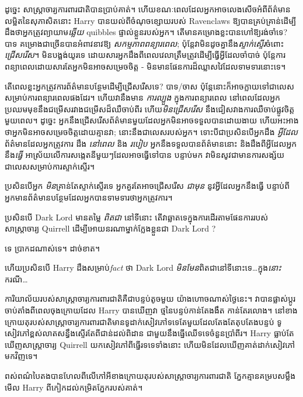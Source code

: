 
 

\hplettrineextrapara
ដូច្នេះ សាស្ត្រាចារ្យការពារជាតិបានប្រាប់គាត់។ ហើយខណៈពេលដែលអ្នកអាចលេងសើចអំពីព័ត៌មានលម្អិតនៃសុភាសិតនោះ Harry បានយល់ពីចំណុចខ្សោយរបស់ Ravenclaws ឱ្យបានគ្រប់គ្រាន់ដើម្បីដឹងថាអ្នកត្រូវព្យាយាម\emph{ឆ្លើយ} quibbles ផ្ទាល់ខ្លួនរបស់អ្នក។ តើ​មាន​គម្រោង​ខ្លះ​បាន​ហៅ​ឱ្យ​រង់ចាំ​ទេ? បាទ គម្រោងជាច្រើនបានអំពាវនាវឱ្យ \emph{សកម្មភាពពន្យារពេល}; ប៉ុន្តែវាមិនដូចគ្នានឹង\emph{ស្ទាក់ស្ទើរ}ចំពោះ\emph{ជ្រើសរើស}។ មិនបង្អង់យូរទេ ដោយសារអ្នកដឹងពីពេលវេលាត្រឹមត្រូវដើម្បីធ្វើអ្វីដែលចាំបាច់ ប៉ុន្តែការពន្យាពេលដោយសារតែអ្នកមិនអាចសម្រេចចិត្ត - មិនមានផែនការដ៏ឈ្លាសវៃដែលទាមទារនោះទេ។

តើពេលខ្លះអ្នកត្រូវការព័ត៌មានបន្ថែមដើម្បីជ្រើសរើសទេ? បាទ/ចាស ប៉ុន្តែនោះក៏អាចក្លាយទៅជាលេសសម្រាប់ការពន្យារពេលផងដែរ។ ហើយវានឹងមាន \emph{ការល្បួង} ក្នុងការពន្យារពេល នៅពេលដែលអ្នកប្រឈមមុខនឹងជម្រើសរវាងជម្រើសដ៏ឈឺចាប់ពីរ ហើយ\emph{មិនជ្រើសរើស} នឹងជៀសវាងការឈឺចាប់ផ្លូវចិត្តមួយពេល។ ដូច្នេះ អ្នក​នឹង​ជ្រើសរើស​ព័ត៌មាន​មួយ​ដែល​អ្នក​មិន​អាច​ទទួល​បាន​ដោយ​ងាយ ហើយ​អះអាង​ថា​អ្នក​មិន​អាច​សម្រេច​ចិត្ត​ដោយ​គ្មាន​វា; នោះនឹងជាលេសរបស់អ្នក។ ទោះបីជាប្រសិនបើអ្នកដឹង \emph{អ្វីដែល} ព័ត៌មានដែលអ្នកត្រូវការ ដឹង \emph{នៅពេល} និង \emph{របៀប} អ្នកនឹងទទួលបានព័ត៌មាននោះ និងដឹងពីអ្វីដែលអ្នកនឹង\emph{ធ្វើ} អាស្រ័យលើការសង្កេតនីមួយៗដែលអាចធ្វើទៅបាន បន្ទាប់មក វាមិនសូវជាមានការសង្ស័យជាលេសសម្រាប់ការស្ទាក់ស្ទើរ។

ប្រសិនបើអ្នក \emph{មិន}គ្រាន់តែស្ទាក់ស្ទើរទេ អ្នកគួរតែអាចជ្រើសរើស \emph{ជាមុន} នូវអ្វីដែលអ្នកនឹងធ្វើ បន្ទាប់ពីអ្នកមានព័ត៌មានបន្ថែមដែលអ្នកបានទាមទារថាអ្នកត្រូវការ។

ប្រសិនបើ Dark Lord មានតម្លៃ \emph{ពិតជា} នៅទីនោះ តើវាឆ្លាតទេក្នុងការដើរតាមផែនការរបស់សាស្រ្តាចារ្យ Quirrell ដើម្បីអោយនរណាម្នាក់ក្លែងខ្លួនជា Dark Lord ?

ទេ ប្រាកដណាស់ទេ។ ដាច់ខាត។

ហើយប្រសិនបើ Harry ដឹងសម្រាប់\emph{fact} ថា Dark Lord \emph{មិនមែន}ពិតជានៅទីនោះទេ…ក្នុង\emph{នោះ}ករណី…

ការិយាល័យរបស់សាស្ត្រាចារ្យការពារជាតិគឺជាបន្ទប់តូចមួយ យ៉ាងហោចណាស់ថ្ងៃនេះ។ វាបានផ្លាស់ប្តូរចាប់តាំងពីពេលចុងក្រោយដែល Harry បានឃើញវា ថ្មនៃបន្ទប់កាន់តែងងឹត កាន់តែរលោង។ នៅខាងក្រោយតុរបស់សាស្ត្រាចារ្យការពារជាតិមានទូដាក់សៀវភៅទទេតែមួយដែលតែងតែតុបតែងបន្ទប់ ទូសៀវភៅខ្ពស់លាតសន្ធឹងស្ទើរតែពីជាន់ដល់ពិដាន ជាមួយនឹងធ្នើឈើទទេចំនួនប្រាំពីរ។ Harry ធ្លាប់តែឃើញសាស្រ្តាចារ្យ Quirrell យកសៀវភៅពីធ្នើរទទេទាំងនោះ ហើយមិនដែលឃើញគាត់ដាក់សៀវភៅមកវិញទេ។

ពស់​ពណ៌​បៃតង​បាន​ហែល​ពីលើ​កៅអី​ខាងក្រោយ​តុ​របស់​សាស្ត្រាចារ្យ​ការពារ​ជាតិ ភ្នែក​គ្មាន​គម្រប​សម្លឹង​មើល Harry ពី​កៀក​ដល់​កម្រិត​ភ្នែក​របស់​គាត់។

